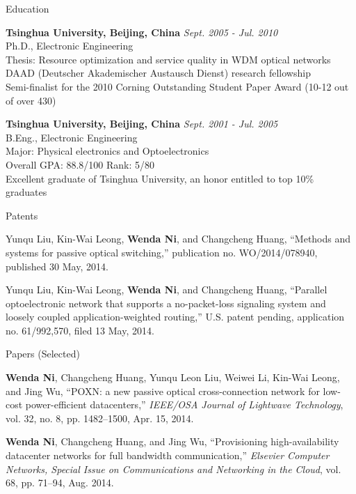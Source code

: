 \documentclass{resume} %
\begin{document}
\begin{rSection}{Education}

{\bf Tsinghua University, Beijing, China} \hfill {\em Sept. 2005 - Jul. 2010} \\ 
Ph.D., Electronic Engineering \\
Thesis: Resource optimization and service quality in WDM optical networks \\
DAAD (Deutscher Akademischer Austausch Dienst) research fellowship \\
Semi-finalist for the 2010 Corning Outstanding Student Paper Award (10-12 out of over 430)

{\bf Tsinghua University, Beijing, China} \hfill {\em Sept. 2001 - Jul. 2005} \\ 
B.Eng., Electronic Engineering \\
Major: Physical electronics and Optoelectronics \\
Overall GPA: 88.8/100 Rank: 5/80 \\
Excellent graduate of Tsinghua University, an honor entitled to top 10\% graduates

\end{rSection}



\begin{rSection}{Patents}

Yunqu Liu, Kin-Wai Leong, \textbf{Wenda Ni}, and Changcheng Huang, ``Methods and systems for passive optical switching,'' publication no. WO/2014/078940, published 30 May, 2014.

Yunqu Liu, Kin-Wai Leong, \textbf{Wenda Ni}, and Changcheng Huang, ``Parallel optoelectronic network that supports a no-packet-loss signaling system and loosely coupled application-weighted routing,'' U.S. patent pending, application no. 61/992,570, filed 13 May, 2014.
\end{rSection}



\begin{rSection}{Papers (Selected)}

\textbf{Wenda Ni}, Changcheng Huang, Yunqu Leon Liu, Weiwei Li, Kin-Wai Leong, and Jing Wu, ``POXN: a new passive optical cross-connection network for low-cost power-efficient datacenters,'' \textit{IEEE/OSA Journal of Lightwave Technology}, vol. 32, no. 8, pp. 1482--1500, Apr. 15, 2014.

\textbf{Wenda Ni}, Changcheng Huang, and Jing Wu, ``Provisioning high-availability datacenter networks for full bandwidth communication,'' \textit{Elsevier Computer Networks, Special Issue on Communications and Networking in the Cloud}, vol. 68, pp. 71--94, Aug. 2014.

\end{rSection}
\end{document}
